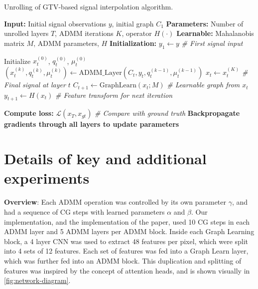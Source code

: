 \documentclass{article}
\theoremstyle{plain}
\theoremstyle{definition}
\theoremstyle{remark}
\begin{document}
\begin{algorithm}[h]
   \caption{Unrolling of GTV-based signal interpolation algorithm.}
   \label{alg:ugtv_admm_bp}
\begin{algorithmic}
   \STATE \textbf{Input:} Initial signal observations $y$, initial graph $C_1$
   \STATE \textbf{Parameters:} Number of unrolled layers $T$, ADMM iterations $K$, operator $H(\cdot)$
   \STATE \textbf{Learnable:} Mahalanobis matrix $M$, ADMM parameters, $H$
   \STATE \textbf{Initialization:} $y_1 \gets y$ \hfill \textit{\# First signal input}

       \STATE Initialize $x_t^{(0)}$, $q_t^{(0)}$, $\mu_t^{(0)}$
            \STATE $(x_t^{(k)}, q_t^{(k)}, \mu_t^{(k)}) \gets \text{ADMM\_Layer}(C_t, y_t, q_t^{(k-1)}, \mu_t^{(k-1)})$
       \ENDFOR
       \STATE $x_t \gets x_t^{(K)}$ \hfill \textit{\# Final signal at layer $t$}
           \STATE $C_{t+1} \gets \text{GraphLearn}(x_t; M)$ \hfill \textit{\# Learnable graph from $x_t$}
           \STATE $y_{t+1} \gets H(x_t)$ \hfill \textit{\# Feature transform for next iteration}
       \ENDIF
   \ENDFOR

   \STATE \textbf{Compute loss:} $\mathcal{L}(x_T, x_{gt})$ \hfill \textit{\# Compare with ground truth}
   \STATE \textbf{Backpropagate gradients through all layers to update parameters}
\end{algorithmic}
\end{algorithm}


\section{Details of key and additional experiments}
\label{appendix:experiments}
\textbf{Overview}: Each ADMM operation was controlled by its own parameter $\gamma$, and had a sequence of CG steps with learned parameters $\alpha$ and $\beta$. Our implementation, and the implementation of the paper, used 10 CG steps in each ADMM layer and 5 ADMM layers per ADMM block. Inside each Graph Learning block, a 4 layer CNN was used to extract 48 features per pixel, which were split into 4 sets of 12 features. Each set of features was fed into a Graph Learn layer, which was further fed into an ADMM block. This duplication and splitting of features was inspired by the concept of attention heads, and is shown visually in \ref{fig:network-diagram}.
\end{document}
